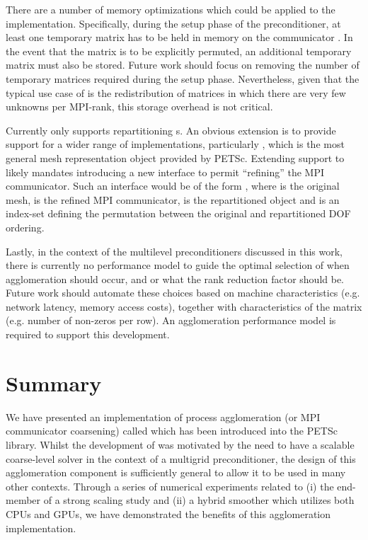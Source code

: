 \documentclass[]{siamart0216}
\begin{document}
There are a number of memory optimizations which could be applied to the  implementation. 
Specifically, during the setup phase of the preconditioner, at least one temporary matrix has to be held in memory on the communicator .
In the event that the matrix is to be explicitly permuted, an additional temporary matrix must also be stored.
Future work should focus on removing the number of temporary matrices required during the setup phase.
Nevertheless, given that the typical use case of  is the redistribution of matrices in which there are very few unknowns per MPI-rank, this storage overhead is not critical.

Currently  only supports repartitioning s. 
An obvious extension is to provide support for a wider range of  implementations, 
particularly , which is the most general mesh representation object provided by PETSc. 
Extending support to  likely mandates introducing a new  interface to permit ``refining'' the MPI communicator. Such an interface would be of the form , where  is the original mesh,  is the refined MPI communicator,  is the repartitioned  object and  is an index-set defining the permutation between the original and repartitioned DOF ordering.

Lastly, in the context of the multilevel preconditioners discussed in this work, 
there is currently no performance model to guide the optimal selection of when agglomeration 
should occur, and or what the rank reduction factor should be. 
Future work should automate these choices based on machine characteristics (e.g. network latency, memory access costs), together 
with characteristics of the matrix (e.g. number of non-zeros per row). An agglomeration performance model is required to support this development.


\section{Summary}
We have presented an implementation of process agglomeration (or MPI communicator coarsening) 
called  which has been introduced into the PETSc library. Whilst the development of  was 
motivated by the need to have a scalable coarse-level solver in the context of a multigrid preconditioner, the design of 
this agglomeration component is sufficiently general to allow it to be used in many other contexts.  
Through a series of numerical experiments related to (i) the end-member of a strong scaling study and (ii) a hybrid 
smoother which utilizes both CPUs and GPUs, we have demonstrated the benefits of this agglomeration 
implementation. 
\end{document}
